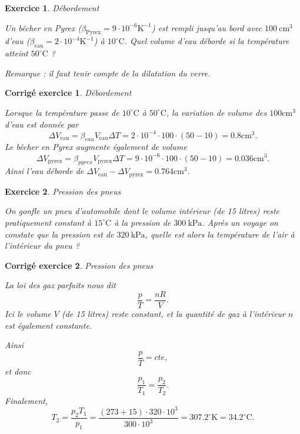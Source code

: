 \documentclass[a4paper,12pt]{article}
\newtheorem{exercice}{Exercice}
\newtheorem{corrige}{Corrig\'e exercice}
\newcommand{\cm}{\mathrm{cm}}
\newcommand{\K}{\mathrm{K}}
\newcommand{\C}{\mathrm{C}}
\newcommand{\oC}{^\circ\C}
\begin{document}
\begin{exercice}{Débordement}

Un bêcher en Pyrex ($\beta_\mathrm{Pyrex}=9\cdot10^{-6}\K^{-1}$) est rempli jusqu'au bord avec $100\ \cm^3$ d'eau ($\beta_\mathrm{eau}=2\cdot10^{-4}\K^{-1}$) à $10\oC$.
Quel volume d'eau déborde si la température atteint $50\oC$ ?

Remarque : il faut tenir compte de la dilatation du verre.
\end{exercice}

\begin{corrige}{Débordement}

Lorsque la température passe de $10\oC$ à $50\oC$, la variation de volume 
des $100\cm^3$ d'eau est donnée par 
\begin{equation}
\Delta V_\mathrm{eau}=\beta_{eau}V_\mathrm{eau}\Delta T=2\cdot 10^{-4}\cdot 100\cdot(50-10)=0.8\cm^3.
\end{equation}
Le bêcher en Pyrex augmente également de volume
\begin{equation}
\Delta V_\mathrm{pyrex}=\beta_{pyrex}V_\mathrm{pyrex}\Delta T=9\cdot 10^{-6}\cdot 100\cdot(50-10)=0.036\cm^3.
\end{equation}
Ainsi l’eau déborde de $\Delta V_\mathrm{eau}-\Delta V_\mathrm{pyrex}=0.764\cm^3$.
\end{corrige}

\begin{exercice}{Pression des pneus}

On gonfle un pneu d’automobile dont le volume intérieur
(de 15 litres) reste pratiquement constant à $15\oC$ à la pression de $300\ \mathrm{kPa}$.
Après un voyage on constate que la pression est de $320\ \mathrm{kPa}$, quelle est alors la température de l’air à
l’intérieur du pneu ?
\end{exercice}

\begin{corrige}{Pression des pneus}
    
La loi des gaz parfaits nous dit
\begin{equation}
\frac{p}{T}=\frac{nR}{V}.
\end{equation}
Ici le volume $V$ (de 15 litres) reste constant, et la quantité de gaz à l’intérieur $n$ est également constante.

Ainsi 
\begin{equation}
\frac{p}{T}=cte,
\end{equation}
et donc
\begin{equation}
\frac{p_1}{T_1}=\frac{p_2}{T_2}.
\end{equation}
Finalement,
\begin{equation}
T_2=\frac{p_2T_1}{p_1}=\frac{(273+15)\cdot 320\cdot 10^3}{300\cdot 10^3}=307.2^\circ\K=34.2\oC.
\end{equation}

\end{corrige}
\end{document}
